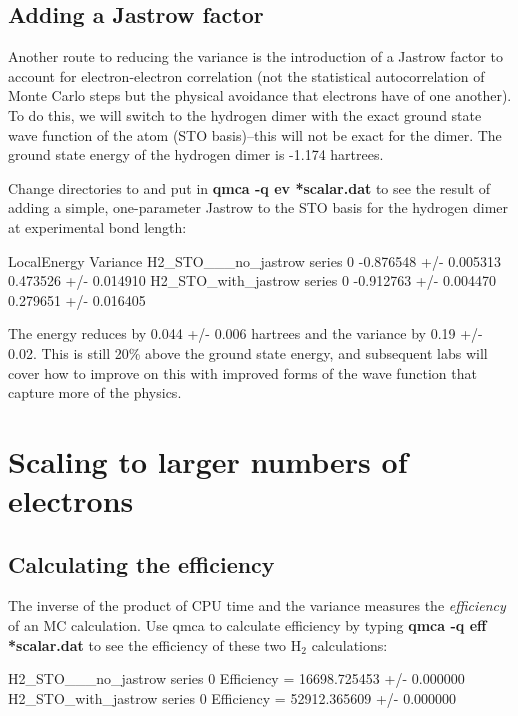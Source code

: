 \subsection{Adding a Jastrow factor}

Another route to reducing the variance is the introduction of a Jastrow factor to 
account for electron-electron correlation (not the statistical autocorrelation
of Monte Carlo steps but the physical avoidance that electrons have of one another).
To do this, we will switch to the hydrogen dimer with the exact ground state
wave function of the atom (STO basis)--this will not be exact for the dimer.
The ground state energy of the hydrogen dimer is -1.174 hartrees.

Change directories to  and put in \textbf{qmca -q ev *scalar.dat}
to see the result of adding a simple, one-parameter Jastrow to the STO basis
for the hydrogen dimer at experimental bond length:

\begin{shade}
                               LocalEnergy               Variance           
H2_STO___no_jastrow  series 0  -0.876548 +/- 0.005313   0.473526 +/- 0.014910
H2_STO_with_jastrow  series 0  -0.912763 +/- 0.004470   0.279651 +/- 0.016405
\end{shade}

The energy reduces by 0.044 +/- 0.006 hartrees and the variance by 0.19 +/- 0.02.
This is still 20\% above the ground state energy, and subsequent labs will cover how
to improve on this with improved forms of the wave function that capture more
of the physics.

\section{Scaling to larger numbers of electrons}

\subsection{Calculating the efficiency}

The inverse of the product of CPU time and the variance measures the
\textit{efficiency} of an MC calculation.  Use qmca to calculate efficiency by
typing \textbf{qmca -q eff *scalar.dat} to see the efficiency of these two
H$_2$ calculations:

\begin{shade}
H2_STO___no_jastrow  series 0  Efficiency = 16698.725453 +/- 0.000000 
H2_STO_with_jastrow  series 0  Efficiency = 52912.365609 +/- 0.000000 
\end{shade}

